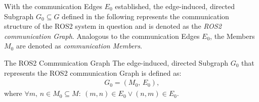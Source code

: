     With the communication Edges $E_0$ established, the edge-induced, directed Subgraph $G_0\subseteq G$ defined in the following represents the communication structure of the ROS2 system in question and is denoted as the \emph{ROS2 communication Graph}. Analogous to the communication Edges $E_0$, the Members $M_0$ are denoted as \emph{communication Members}.
\enlargethispage{1\baselineskip}
    \begin{definitionbox}[label=def:ros2edgeInducedSubgraph, list text={The ROS2 Communication Graph}]{The ROS2 Communication Graph \cite[p.~3]{adaPaper}}{}
        The edge-induced, directed Subgraph $G_0$ that represents the ROS2 communication Graph is defined as:
        \begin{align*}
            G_0=(M_0,\,E_0)\text{,}
        \end{align*}
        where $\forall m,\,n\in M_0\subseteq M\colon\:(m,n)\in E_0 \vee (n,m)\in E_0$.
    \end{definitionbox}


